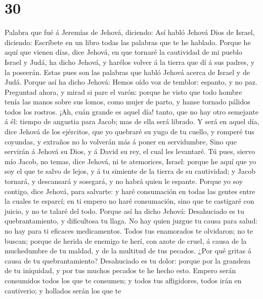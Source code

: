 \hypertarget{section-29}{%
\section{30}\label{section-29}}

 Palabra que fué á Jeremías de Jehová, diciendo:
 Así habló Jehová Dios de Israel, diciendo: Escríbete en
un libro todas las palabras que te he hablado.  Porque he
aquí que vienen días, dice Jehová, en que tornaré la cautividad de mi
pueblo Israel y Judá, ha dicho Jehová, y harélos volver á la tierra que
dí á sus padres, y la poseerán.  Estas pues son las
palabras que habló Jehová acerca de Israel y de Judá. 
Porque así ha dicho Jehová: Hemos oído voz de temblor: espanto, y no
paz.  Preguntad ahora, y mirad si pare el varón: porque he
visto que todo hombre tenía las manos sobre sus lomos, como mujer de
parto, y hanse tornado pálidos todos los rostros.  ¡Ah,
cuán grande es aquel día! tanto, que no hay otro semejante á él: tiempo
de angustia para Jacob; mas de ella será librado.  Y será
en aquel día, dice Jehová de los ejércitos, que yo quebraré su yugo de
tu cuello, y romperé tus coyundas, y extraños no lo volverán más á poner
en servidumbre,  Sino que servirán á Jehová su Dios, y á
David su rey, el cual les levantaré.  Tú pues, siervo mío
Jacob, no temas, dice Jehová, ni te atemorices, Israel: porque he aquí
que yo soy el que te salvo de lejos, y á tu simiente de la tierra de su
cautividad; y Jacob tornará, y descansará y sosegará, y no habrá quien
le espante.  Porque yo soy contigo, dice Jehová, para
salvarte: y haré consumación en todas las gentes entre la cuales te
esparcí; en ti empero no haré consumación, sino que te castigaré con
juicio, y no te talaré del todo.  Porque así ha dicho
Jehová: Desahuciado es tu quebrantamiento, y dificultosa tu llaga.
 No hay quien juzgue tu causa para salud: no hay para ti
eficaces medicamentos.  Todos tus enamorados te
olvidaron; no te buscan; porque de herida de enemigo te herí, con azote
de cruel, á causa de la muchedumbre de tu maldad, y de la multitud de
tus pecados.  ¿Por qué gritas á causa de tu
quebrantamiento? Desahuciado es tu dolor: porque por la grandeza de tu
iniquidad, y por tus muchos pecados te he hecho esto. 
Empero serán consumidos todos los que te consumen; y todos tus
afligidores, todos irán en cautiverio; y hollados serán los que te
